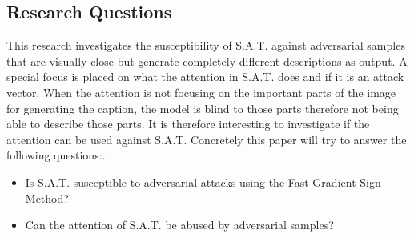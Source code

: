 \subsection{Research Questions}
This research investigates the susceptibility of S.A.T. against adversarial samples that are visually close but generate completely different descriptions as output. A special focus is placed on what the attention in S.A.T. does and if it is an attack vector. When the attention is not focusing on the important parts of the image for generating the caption, the model is blind to those parts therefore not being able to describe those parts. It is therefore interesting to investigate if the attention can be used against S.A.T.
Concretely this paper will try to answer the following questions:.
\begin{itemize}
    \item Is S.A.T. susceptible to adversarial attacks using the Fast Gradient Sign Method?
    \item Can the attention of S.A.T. be abused by adversarial samples?
\end{itemize}
